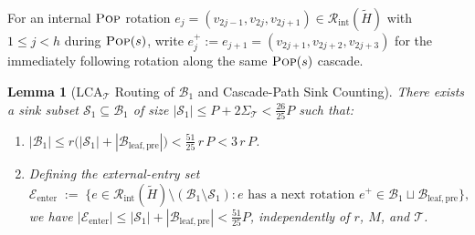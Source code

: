 \documentclass[11pt]{article}
\newtheorem{lemma}[theorem]{Lemma}
\theoremstyle{definition}
\theoremstyle{remark}
\newcommand{\LCA}{\mathrm{LCA}}
\newcommand{\POP}{\textnormal{\scshape Pop}}
\begin{document}
For an internal $\POP$ rotation $e_j = (v_{2j-1}, v_{2j}, v_{2j+1}) \in \mathcal{R}_{\mathrm{int}}(\widetilde{H})$ with $1 \le j < h$ during $\POP(s)$, write $e_j^+ := e_{j+1} = (v_{2j+1}, v_{2j+2}, v_{2j+3})$ for the immediately following rotation along the same $\POP(s)$ cascade.

\begin{lemma}[$\LCA_{\mathcal{T}}$ Routing of $\mathcal{B}_1$ and Cascade-Path Sink Counting]
\label{lem:bucket-b1}
There exists a sink subset $\mathcal{S}_1 \subseteq \mathcal{B}_1$ of size $|\mathcal{S}_1| \le P + 2\Sigma_{\mathcal{T}} < \frac{26}{25} P$ such that:
\begin{enumerate}[label=(\arabic*)]
  \item $|\mathcal{B}_1| \le r\big(|\mathcal{S}_1| + |\mathcal{B}_{\mathrm{leaf,pre}}|\big) < \frac{51}{25}\,r\,P < 3\,r\,P$.
  \item Defining the external-entry set
  \[
  \mathcal{E}_{\mathrm{enter}} \;:=\; \Big\{ e \in \mathcal{R}_{\mathrm{int}}(\widetilde{H}) \setminus (\mathcal{B}_1 \setminus \mathcal{S}_1) : e \text{ has a next rotation } e^+ \in \mathcal{B}_1 \sqcup \mathcal{B}_{\mathrm{leaf,pre}} \Big\},
  \]
  we have $|\mathcal{E}_{\mathrm{enter}}| \le |\mathcal{S}_1| + |\mathcal{B}_{\mathrm{leaf,pre}}| < \frac{51}{25} P$, independently of $r$, $M$, and $\mathcal{T}$.
\end{enumerate}
\end{lemma}
\end{document}
